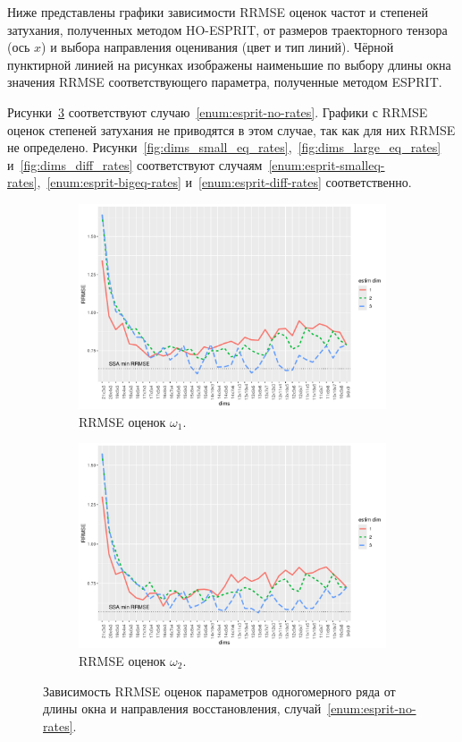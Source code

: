 \documentclass[specialist,
  substylefile=spbu.rtx,
subf,href,colorlinks=true, 12pt]{disser}
\theoremstyle{plain}
\theoremstyle{definition}
\theoremstyle{remark}
\begin{document}
Ниже представлены графики зависимости RRMSE оценок частот и степеней затухания,
полученных методом HO-ESPRIT, от размеров траекторного тензора
(ось $x$) и выбора направления оценивания (цвет и тип линий).
Чёрной пунктирной линией на рисунках изображены наименьшие по выбору длины окна значения RRMSE
соответствующего параметра, полученные методом ESPRIT.

Рисунки~\ref{fig:dims_no_rates} соответствуют случаю~\ref{enum:esprit-no-rates}.
Графики с RRMSE оценок степеней затухания не приводятся в этом случае, так как для них RRMSE не определено.
Рисунки~\ref{fig:dims_small_eq_rates},~\ref{fig:dims_large_eq_rates} и~\ref{fig:dims_diff_rates}
соответствуют случаям~\ref{enum:esprit-smalleq-rates},~\ref{enum:esprit-bigeq-rates} и~\ref{enum:esprit-diff-rates}
соответственно.
\begin{figure}[!ht]
  \centering
  \begin{subfigure}{0.49\linewidth}
    \includegraphics[width=\linewidth]{freq1_dims_no_rates.pdf}
    \caption{RRMSE оценок $\omega_1$.}
    \label{fig:freq1_dims_no_rates}
  \end{subfigure}
  \begin{subfigure}{0.49\linewidth}
    \includegraphics[width=\linewidth]{freq2_dims_no_rates.pdf}
    \caption{RRMSE оценок $\omega_2$.}
    \label{fig:freq2_dims_no_rates}
  \end{subfigure}
  \caption{Зависимость RRMSE оценок параметров одногомерного ряда
    от длины окна и направления восстановления,
  случай~\ref{enum:esprit-no-rates}.}
  \label{fig:dims_no_rates}
\end{figure}
\end{document}
